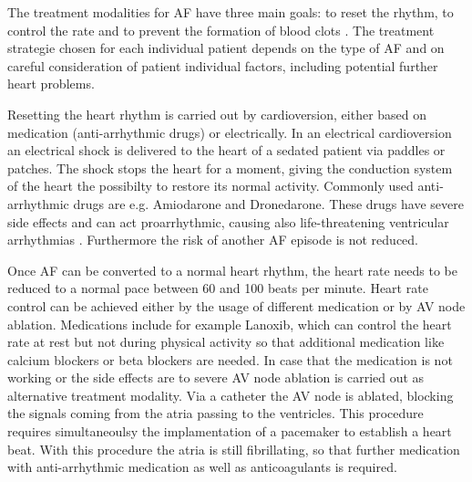 \documentclass[type=dr, dr=rernat, accentcolor=tud7b,colorbacktitle, bigchapter, openright, twoside, 12pt ]{tudthesis}
\begin{document}
The treatment modalities for AF have three main goals: to reset the rhythm, to control the rate and to prevent the formation of blood clots \cite{Mayo} \cite{CE09}. The treatment strategie chosen for each individual patient depends on the type of AF and on careful consideration of patient individual factors, including potential further heart problems. \newline

Resetting the heart rhythm is carried out by cardioversion, either based on medication (anti-arrhythmic drugs) or electrically. In an electrical cardioversion an electrical shock is delivered to the heart of a sedated patient via paddles or patches. The shock stops the heart for a moment, giving the conduction system of the heart the possibilty to restore its normal activity. Commonly used anti-arrhythmic drugs are e.g. Amiodarone and Dronedarone. These drugs have severe side effects and can act proarrhythmic, causing also 
life-threatening ventricular arrhythmias \cite{Mayo}. Furthermore the risk of another AF episode is not reduced.\newline

Once AF can be converted to a normal heart rhythm, the heart rate needs to be reduced to a normal pace between 60 and 100 beats per minute. Heart rate control can be achieved either by the usage of different medication or by AV node ablation. Medications include for example Lanoxib, which can control the heart rate at rest but not during physical activity so that additional medication like calcium blockers or beta blockers are needed. In case that the medication is not working or the side effects are to severe AV node ablation is carried out as alternative treatment modality. Via a catheter the AV node is ablated, blocking the signals coming from the atria passing to the ventricles. This procedure requires simultaneoulsy the implamentation of a pacemaker to establish a heart beat. With this procedure the atria is still fibrillating, so that further medication with anti-arrhythmic medication as well as anticoagulants is required.\newline
\end{document}
